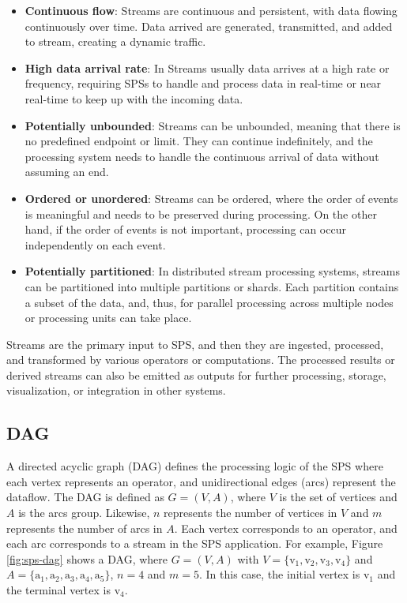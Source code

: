 \begin{itemize}
\item \textbf{Continuous flow}: Streams are continuous and persistent, with data flowing continuously over time. Data arrived are generated, transmitted, and added to stream, creating a dynamic traffic.

\item \textbf{High data arrival rate}: In Streams usually data arrives at a high rate or frequency, requiring SPSs to handle and process data in real-time or near real-time to keep up with the incoming data.

\item \textbf{Potentially unbounded}: Streams can be unbounded, meaning that there is no predefined endpoint or limit. They can continue indefinitely, and the processing system needs to handle the continuous arrival of data without assuming an end.

\item \textbf{Ordered or unordered}: Streams can be ordered, where the order of events is meaningful and needs to be preserved during processing. On the other hand, if the order of events is not important, processing can occur independently on each event.

\item \textbf{Potentially partitioned}: In distributed stream processing systems, streams can be partitioned into multiple partitions or shards. Each partition contains a subset of the data, and, thus, for parallel processing across multiple nodes or processing units can take place.
\end{itemize}

Streams are the primary input to SPS, and then they are ingested, processed, and transformed by various operators or computations. The processed results or derived streams can also be emitted as outputs for further processing, storage, visualization, or integration in other systems.


\subsection{DAG}
A directed acyclic graph (DAG) defines the processing logic of the SPS where each vertex represents an operator, and unidirectional edges (arcs) represent the dataflow. The DAG is defined as $G=(V,A)$, where $V$ is the set of vertices and $A$ is the arcs group. Likewise, $n$ represents the number of vertices in $V$ and $m$ represents the number of arcs in $A$. Each vertex corresponds to an operator, and each arc corresponds to a stream in the SPS application. For example, Figure \ref{fig:sps-dag} shows a DAG, where $G=(V,A)$ with $V=\{\text{v}_1,\text{v}_2,\text{v}_3,\text{v}_4\}$ and $A=\{\text{a}_1,\text{a}_2,\text{a}_3,\text{a}_4,\text{a}_5\}$, $n=4$ and $m=5$. In this case, the initial vertex is $\text{v}_1$ and the terminal vertex is $\text{v}_4$.

